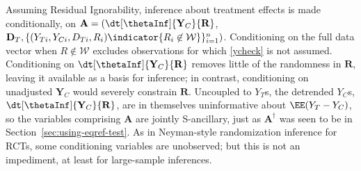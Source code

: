 
\sloppy
Assuming Residual Ignorability, inference about treatment effects is
made conditionally, on
$\mathbf{A}= (\dt[\thetaInf]{\mathbf{Y}_{C}}{ \mathbf{R}}$, $\mathbf{D}_{T},
\{(Y_{Ti}, Y_{Ci}, D_{Ti}, R_{i}) \indicator{{R}_{i} \not\in
  \mathcal{W}}\}_{i=1}^{n})$.
Conditioning on the full data vector when $R \not\in \mathcal{W}$
excludes observations for which \eqref{ycheck} is not assumed.
Conditioning on
$\dt[\thetaInf]{\mathbf{Y}_{C}}{ \mathbf{R}}$
removes little of the randomness %
in $\mathbf{R}$, leaving it available as a basis for inference; in
contrast, conditioning on unadjusted $\mathbf{Y}_C$
would severely constrain $\mathbf{R}$.
Uncoupled to $Y_{T}$s, the detrended  $Y_{C}$s,
$\dt[\thetaInf]{\mathbf{Y}_{C}}{ \mathbf{R}}$,
are in themselves uninformative about $\EE(Y_{T} - Y_{C})$, so
the variables comprising $\mathbf{A}$ are jointly
S-ancillary, just as $\mathbf{A}^{\dagger}$ was seen to be
in Section~\ref{sec:using-eqref-test}.  As in Neyman-style randomization inference for RCTs, some conditioning variables are
unobserved; but this is not an impediment, at least for large-sample
inferences.



